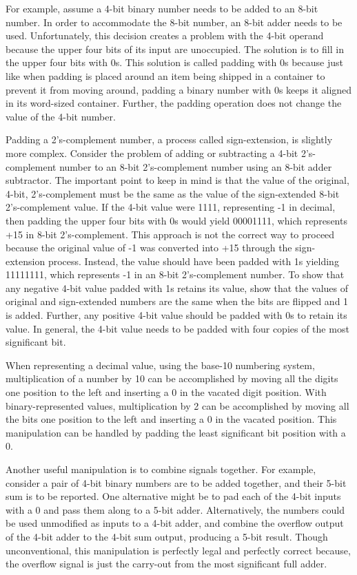For example, assume a 4-bit binary number 
needs to be added to an 8-bit number.  In order to 
accommodate the 8-bit number, an 8-bit
adder needs to be used.  Unfortunately, this decision creates a 
problem with the 
4-bit operand because the upper four bits of its input
are unoccupied.  The solution is to fill in the upper
four bits with 0s.  This solution is called padding with 0s 
because just like when padding is placed around an item
being shipped in a container to prevent it 
from moving around, padding a binary number with 0s 
keeps it aligned in its word-sized container. Further, the padding operation does not 
change the value of the 4-bit number.

Padding a 2's-complement number, a process called sign-extension,
is slightly more complex. Consider the problem of adding or 
subtracting a 4-bit 2's-complement number to an 8-bit 2's-complement 
number using an 8-bit adder subtractor.  The important 
point to keep in mind is that the value of the original, 4-bit, 
2's-complement must be the same as the value of the sign-extended 
8-bit 2's-complement value.  If the 4-bit value were 1111, 
representing -1 in decimal, then padding the upper four
bits with 0s would yield 00001111, which represents +15
in 8-bit 2's-complement.  This approach is not the correct way to proceed
because the original value of -1 was converted into +15 
through the sign-extension process.  Instead, the value should have been padded 
with 1s yielding 11111111, which represents -1 in an
8-bit 2's-complement number.  To show
that any negative 4-bit value padded with 1s retains its value,
show that the values of original and sign-extended 
numbers are the same when the bits are flipped and 1 is added.
Further,  any positive 4-bit value should
be padded with 0s to retain its value.  In general, the 4-bit
value needs to be padded with four copies of the most significant 
bit.

When representing a decimal value, using the base-10 numbering system, 
multiplication of a 
number by 10 can be accomplished by moving all the digits
one position to the left and inserting a 0 in the vacated
digit position.  With binary-represented values,
multiplication by 2 can be accomplished by moving all the
bits one position to the left and inserting a 0 in the 
vacated position.  This manipulation can be handled by padding the least
significant bit position with a 0.

Another useful manipulation is to combine signals together.  For 
example, consider a pair of 4-bit binary numbers
are to be added together, and their 5-bit sum is to be reported.
One alternative might be to pad each of the 4-bit inputs with a 0 and 
pass them along to a 5-bit adder.  Alternatively, 
the numbers could be used unmodified as inputs to a 4-bit adder, 
and combine the overflow output
of the 4-bit adder to the 4-bit sum output, producing a 5-bit result.
Though unconventional, this manipulation is perfectly legal and perfectly 
correct because, the overflow signal is just the 
carry-out from the most significant full adder.

